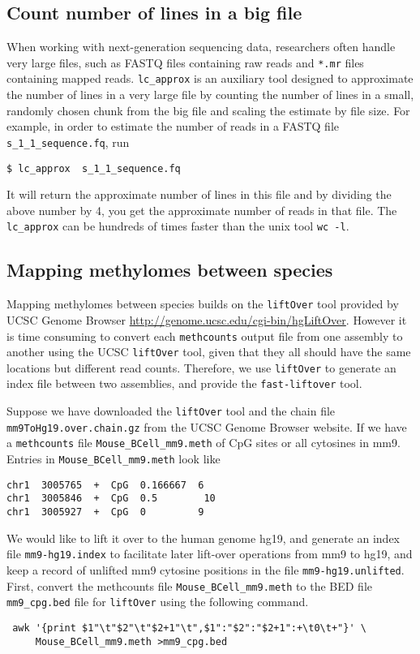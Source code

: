 \documentclass[10pt]{article}
\newcommand{\prog}[1]{\texttt{#1}}
\newcommand{\fn}[1]{\texttt{#1}}
\begin{document}
{{\subsection{Count number of lines in a big file}
\label{sec:count-number-lines}

When working with next-generation sequencing data, researchers often
handle very large files, such as FASTQ files containing raw reads
and \fn{*.mr} files containing mapped reads. \prog{lc\_approx} is
an auxiliary tool designed to approximate the number of lines in a
very large file by counting the number of lines in a small, randomly
chosen chunk from the big file and scaling the estimate by file size.
For example, in order to estimate the number of reads in a FASTQ file
\fn{s\_1\_1\_sequence.fq}, run
\begin{verbatim}
$ lc_approx  s_1_1_sequence.fq
\end{verbatim}
It will return the approximate number of lines in this file and by
dividing the above number by 4, you get the approximate number of
reads in that file. The \prog{lc\_approx} can be hundreds of times
faster than the unix tool \prog{wc -l}.


\subsection{Mapping methylomes between species}
\label{sec:mapp-methyl-betw}
Mapping methylomes between species builds on the \prog{liftOver} tool
provided by UCSC Genome Browser
\url{http://genome.ucsc.edu/cgi-bin/hgLiftOver}. However it is time
consuming to convert each \prog{methcounts} output file from one
assembly to another using the UCSC \prog{liftOver} tool, given that
they all should have the same locations but different read counts.
Therefore, we use \prog{liftOver} to generate an index file between
two assemblies, and provide the \prog{fast-liftover} tool.

Suppose we have downloaded the \prog{liftOver} tool and the chain file
\fn{mm9ToHg19.over.chain.gz} from the UCSC Genome Browser website.  If
we have a \prog{methcounts} file \fn{Mouse\_BCell\_mm9.meth}
of CpG sites or all cytosines in mm9. Entries in
\fn{Mouse\_BCell\_mm9.meth} look like
\begin{verbatim}
chr1  3005765  +  CpG  0.166667  6
chr1  3005846  +  CpG  0.5        10
chr1  3005927  +  CpG  0         9
\end{verbatim}

We would like to lift it over to the human genome hg19, and generate
an index file \fn{mm9-hg19.index} to facilitate later lift-over
operations from mm9 to hg19, and keep a record of unlifted mm9
cytosine positions in the file \fn{mm9-hg19.unlifted}.
First, convert the methcounts file \fn{Mouse\_BCell\_mm9.meth} to the
BED file \fn{mm9\_cpg.bed} file for \prog{liftOver} using the
following command.
\begin{verbatim}
 awk '{print $1"\t"$2"\t"$2+1"\t",$1":"$2":"$2+1":+\t0\t+"}' \
     Mouse_BCell_mm9.meth >mm9_cpg.bed
\end{verbatim}

}}
\end{document}
